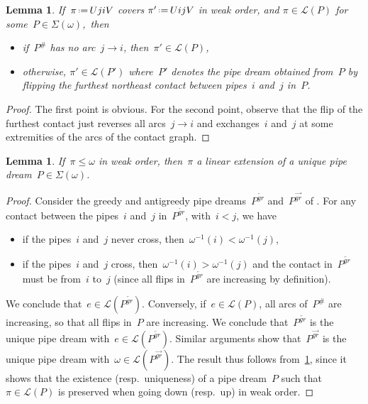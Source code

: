 \documentclass{amsart}
\newtheorem{lemma}[theorem]{Lemma}
\theoremstyle{definition}
\newcommand{\eqdef}{\mbox{\,\raisebox{0.2ex}{\scriptsize\ensuremath{\mathrm:}}\ensuremath{=}\,}} %
\newcommand{\contact}{^\#} %
\newcommand{\acyclicPipeDreams}{\Sigma} %
\newcommand{\linearExtensions}{\mathcal{L}} %
\newcommand{\greedyPipeDream}{P^{\overleftarrow{gr}}} %
\newcommand{\antiGreedyPipeDream}{P^{\overrightarrow{gr}}} %
\begin{document}
\begin{lemma}
\label{lem:lowerSetPipeDreams}
If~$\pi \eqdef UjiV$ covers $\pi' \eqdef UijV$ in weak order, and ${\pi \in \linearExtensions(P)}$ for some~${P \in \acyclicPipeDreams(\omega)}$,~then
\begin{itemize}
\item if~$P\contact$ has no arc~$j \to i$, then~$\pi' \in \linearExtensions(P)$,
\item otherwise, $\pi' \in \linearExtensions(P')$ where~$P'$ denotes the pipe dream obtained from~$P$ by flipping the furthest northeast contact between pipes~$i$ and~$j$ in~$P$.
\end{itemize}
\end{lemma}

\begin{proof}
The first point is obvious.
For the second point, observe that the flip of the furthest contact just reverses all arcs~$j \to i$ and exchanges~$i$ and~$j$ at some extremities of the arcs of the contact graph.
\end{proof}

\begin{lemma}
\label{lem:partition}
If~$\pi \le \omega$ in weak order, then~$\pi$ a linear extension of a unique pipe dream~$P \in \acyclicPipeDreams(\omega)$.
\end{lemma}

\begin{proof}
Consider the greedy and antigreedy pipe dreams~$\greedyPipeDream$ and~$\antiGreedyPipeDream$ of \cite{PilaudPocchiola}.
For any contact between the pipes~$i$ and~$j$ in~$\greedyPipeDream$, with~$i < j$, we have
\begin{itemize}
\item if the pipes~$i$ and~$j$ never cross, then~$\omega^{-1}(i) < \omega^{-1}(j)$,
\item if the pipes~$i$ and~$j$ cross, then~$\omega^{-1}(i) > \omega^{-1}(j)$ and the contact in~$\greedyPipeDream$ must be from~$i$ to~$j$ (since all flips in~$\greedyPipeDream$ are increasing by definition).
\end{itemize}
We conclude that~$e \in \linearExtensions(\greedyPipeDream)$.
Conversely, if~$e \in \linearExtensions(P)$, all arcs of~$P\contact$ are increasing, so that all flips in~$P$ are increasing.
We conclude that~$\greedyPipeDream$ is the unique pipe dream with~$e \in \linearExtensions(\greedyPipeDream)$.
Similar arguments show that~$\antiGreedyPipeDream$ is the unique pipe dream with~$\omega \in \linearExtensions(\antiGreedyPipeDream)$.
The result thus follows from~\cref{lem:lowerSetPipeDreams}, since it shows that the existence (resp.~uniqueness) of a pipe dream~$P$ such that~$\pi \in \linearExtensions(P)$ is preserved when going down (resp.~up) in weak order.
\end{proof}
\end{document}
